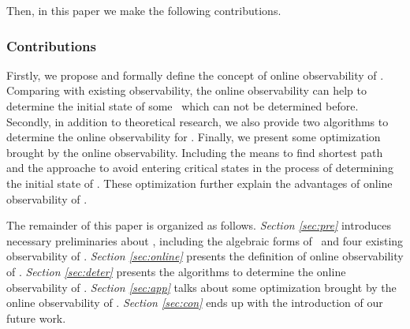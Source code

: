 Then, in this paper we make the following contributions. 


\subsubsection*{Contributions}
Firstly, we propose and formally define the concept of online observability of \BCNs. Comparing with existing observability, the online observability can help to determine the initial state of some \BCNs\ which can not be determined before. Secondly, in addition to theoretical research, we also provide two algorithms to determine the online observability for \BCNs. Finally, we present some optimization brought by the online observability. Including the means to find shortest path and the approache to avoid entering critical states in the process of determining the initial state of \BCNs.  These optimization further explain the advantages of online observability of \BCNs. %

The remainder of this paper is organized as follows.
 {\em Section \ref{sec:pre}} introduces necessary preliminaries about \BCNs, including the algebraic forms of \BCNs\ and four existing observability of \BCNs. {\em Section \ref{sec:online}} presents the definition of online observability of \BCNs. {\em Section \ref{sec:deter}} presents the algorithms to determine the online observability of \BCNs. {\em Section \ref{sec:app}} talks about some optimization brought by the online observability of \BCNs. {\em Section \ref{sec:con}} ends up with the introduction of our future work.


